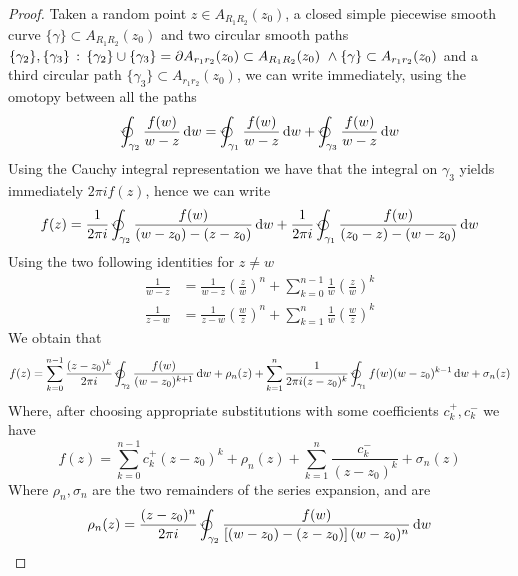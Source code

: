 \documentclass[../complete.tex]{subfiles}
\begin{document}
\begin{proof}
	Taken a random point $z\in A_{R_1R_2}(z_0)$, a closed simple piecewise smooth curve $\{\gamma\}\subset A_{R_1R_2}(z_0)$ and two circular smooth paths $\{\gamma_2\},\{\gamma_3\}\, :\,  \{\gamma_2\}\cup\{\gamma_3\}=\partial A_{r_1r_2}(z_0)\subset A_{R_1R_2}(z_0)\ \wedge \{\gamma\}\subset A_{r_1r_2}(z_0)$ and a third circular path $\{\gamma_3\}\subset A_{r_1r_2}(z_0)$, we can write immediately, using the omotopy between all the paths
	\begin{equation*}
		\ointccw_{\gamma_2}\frac{f(w)}{w-z}\diff w=\ointccw_{\gamma_1}\frac{f(w)}{w-z}\diff w+\ointccw_{\gamma_3}\frac{f(w)}{w-z}\diff w
	\end{equation*}
	Using the Cauchy integral representation we have that the integral on $\gamma_3$ yields immediately $2\pi if(z)$, hence we can write
	\begin{equation*}
		f(z)=\frac{1}{2\pi i}\ointccw_{\gamma_2}\frac{f(w)}{(w-z_0)-(z-z_0)}\diff w+\frac{1}{2\pi i}\ointccw_{\gamma_1}\frac{f(w)}{(z_0-z)-(w-z_0)}\diff w
	\end{equation*}
	Using the two following identities for $z\ne w$
	\begin{equation*}
		\begin{aligned}
			\frac{1}{w-z}&=\frac{1}{w-z}\left( \frac{z}{w} \right)^n+\sum_{k=0}^{n-1}\frac{1}{w}\left( \frac{z}{w} \right)^k\\
			\frac{1}{z-w}&=\frac{1}{z-w}\left( \frac{w}{z} \right)^n+\sum_{k=1}^{n}\frac{1}{w}\left( \frac{w}{z} \right)^k
		\end{aligned}
	\end{equation*}
	We obtain that
	\begin{equation*}
		f(z)=\sum_{k=0}^{n-1}\frac{(z-z_0)^k}{2\pi i}\ointccw_{\gamma_2}\frac{f(w)}{(w-z_0)^{k+1}}\diff w+\rho_n(z)+\sum_{k=1}^{n}\frac{1}{2\pi i(z-z_0)^k}\ointccw_{\gamma_1}f(w)(w-z_0)^{k-1}\diff w+\sigma_n(z)
	\end{equation*}
	Where, after choosing appropriate substitutions with some coefficients $c_k^+,c_k^-$ we have
	\begin{equation*}
		f(z)=\sum_{k=0}^{n-1}c_k^+(z-z_0)^k+\rho_n(z)+\sum_{k=1}^{n}\frac{c_k^-}{(z-z_0)^k}+\sigma_n(z)
	\end{equation*}
	Where $\rho_n,\sigma_n$ are the two remainders of the series expansion, and are
	\begin{equation*}
		\begin{aligned}
			\rho_n(z)&=\frac{(z-z_0)^n}{2\pi i}\ointccw_{\gamma_2}\frac{f(w)}{\left[ (w-z_0)-(z-z_0) \right](w-z_0)^n}\diff w\\

\end{aligned}
\end{equation*}
\end{proof}
\end{document}
